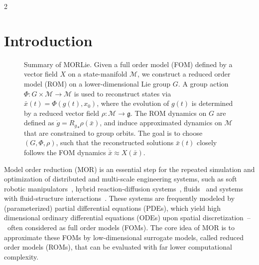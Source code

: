 \documentclass{article}
\newcommand{\yannik}[1]{\textcolor{blue}{\textbf{YW}:~#1}}
\newcommand{\M}{\mathcal{M}}                                %
\newcommand{\state}{x}
\newcommand{\appstate}{\bar{x}}
\begin{document}
\begin{multicols}{2}
    
\section{Introduction}\label{sec:introduction}

\begin{figure}
    \centering
    \def\svgwidth{0.8\linewidth}\scriptsize
    \caption{Summary of MORLie. %
    Given a full order model (FOM) defined by a vector field $X$ on a state-manifold $\M$, we construct a reduced order model (ROM) on a lower-dimensional Lie group $G$. A group action $\Phi:G\times\M\rightarrow\M$ is used to reconstruct states via $\appstate(t) = \Phi(g(t),\state_0)$, where the evolution of $g(t)$ is determined by a reduced vector field $\rho:\M\rightarrow\mathfrak{g}$. The ROM dynamics on $G$ are defined as $\dot{g} = {R_g}_*\rho(\appstate)$, and induce approximated dynamics on $\M$ that are constrained to group orbits. The goal is to choose $(G,\Phi,\rho)$, such that the reconstructed solutions $\appstate(t)$ closely follows the FOM dynamics $\dot{\appstate} \approx X(\appstate)$.
    }\label{fig:MorLie_Overview}
\end{figure}

Model order reduction (MOR) is an essential step for the repeated simulation and optimization of distributed and multi-scale engineering systems, such as soft robotic manipulators~\cite{Sadati2023,Mathew2025,Pustina2024}, 
hybrid reaction-diffusion systems~\cite{Chinesta2011,Grepl2012}, fluids~\cite{Lassila2014} and systems with fluid-structure interactions~\cite{Lee2024}. These systems are frequently modeled by (parameterized) partial differential equations (PDEs), which yield high dimensional ordinary differential equations (ODEs) upon spatial discretization~--~often considered as full order models (FOMs). The core idea of MOR is to approximate these FOMs by low-dimensional surrogate models, called reduced order models (ROMs), that can be evaluated with far lower computational complexity. 


\end{multicols}
\end{document}
